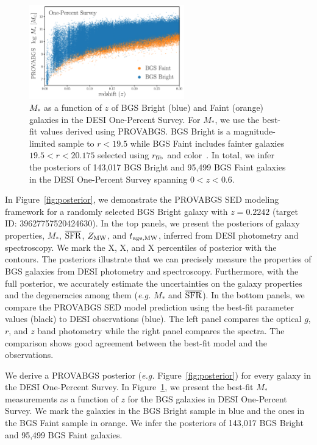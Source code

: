 \begin{figure}
\begin{center}
    \includegraphics[width=0.6\textwidth]{figs/mstar_z.pdf}
    \caption{
        $M_*$ as a function of $z$ of BGS Bright (blue) and Faint (orange)
        galaxies in the DESI One-Percent Survey. 
        For $M_*$, we use the best-fit values derived using PROVABGS. 
        BGS Bright is a magnitude-limited sample to $r < 19.5$ while BGS Faint
        includes fainter galaxies $19.5 < r < 20.175$ selected using $r_{\rm
        fib}$ and color~\citep{hahn2022a}. 
        In total, we infer the posteriors of 143,017 BGS Bright and 95,499 BGS
        Faint galaxies in the DESI One-Percent Survey spanning $0 < z < 0.6$. 
    }\label{fig:mstar_z}
\end{center}
\end{figure}


In Figure~\ref{fig:posterior}, we demonstrate the PROVABGS SED modeling
framework for a randomly selected BGS Bright galaxy with $z=0.2242$ 
(target ID: 39627757520424630).
In the top panels, we present the posteriors of galaxy properties, $M_*$, 
$\overline{\rm SFR}$, $Z_{\rm MW}$, and $t_{\rm age, MW}$, inferred from DESI
photometry and spectroscopy. 
We mark the {\color{red} X, X, and X} percentiles of posterior with the
contours. 
The posteriors illustrate that we can precisely measure the properties of BGS
galaxies from DESI photometry and spectroscopy. 
Furthermore, with the full posterior, we accurately estimate the uncertainties
on the galaxy properties and the degeneracies among them (\emph{e.g.} $M_*$ and
$\overline{\rm SFR}$). 
In the bottom panels, we compare the PROVABGS SED model prediction using the
best-fit parameter values (black) to DESI observations (blue). 
The left panel compares the optical $g$, $r$, and $z$ band photometry while the
right panel compares the spectra. 
The comparison shows good agreement between the best-fit model and the
observations. 

We derive a PROVABGS posterior (\emph{e.g.} Figure~\ref{fig:posterior}) for
every galaxy in the DESI One-Percent Survey. 
In Figure~\ref{fig:mstar_z}, we present the best-fit $M_*$ measurements as a
function of $z$ for the BGS galaxies in DESI One-Percent Survey. 
We mark the galaxies in the BGS Bright sample in blue and the ones in the BGS
Faint sample in orange. 
We infer the posteriors of 143,017 BGS Bright and 95,499 BGS Faint galaxies. 
